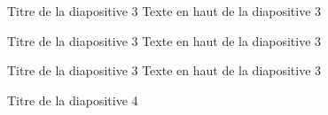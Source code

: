 \documentclass[10pt]{beamer}
\begin{document}
\begin{frame}[fragile]{Titre de la diapositive 3} %
Texte en haut de la diapositive 3
\begin{verbnobox}[\tiny]
\begin{frame}[fragile]{Titre de la diapositive 3}
Texte en haut de la diapositive 3
\begin{Verbnobox}[\tiny]
\begin{frame}[fragile]{Titre de la diapositive 3}
Texte en haut de la diapositive 3
\end{frame}\end{Verbnobox}
\end{frame}\end{verbnobox}
\end{frame}


\begin{frame}[fragile]{Titre de la diapositive 4}
\begin{center}
\end{center}
\end{frame}
\end{document}
